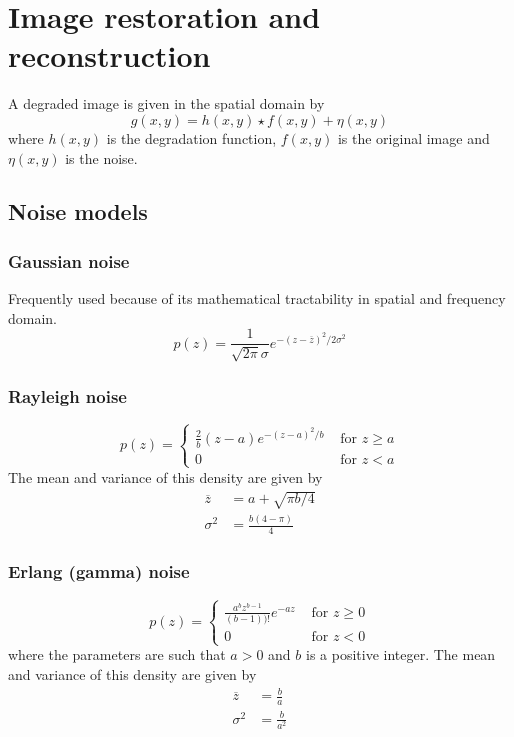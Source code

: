 \section{Image restoration and reconstruction }
A degraded image is given in the spatial domain by
\begin{equation}
	g(x,y) = h(x,y) \star f(x,y) + \eta(x,y)
\end{equation}
where $h(x,y)$ is the degradation function, $f(x,y)$ is the original image and $\eta(x,y)$ is the noise.

\subsection{Noise models  }
	\subsubsection{Gaussian noise}
		Frequently used because of its mathematical tractability in spatial and frequency domain.
		\begin{equation}
			p(z) = \frac{1}{\sqrt{2\pi} \sigma} e^{-\left(z-\overline{z}\right)^2 / 2\sigma^2}
		\end{equation}
		
	\subsubsection{Rayleigh noise}
		\begin{equation}
			p(z) = 
				\begin{cases}
					\frac{2}{b} \left(z-a\right) e^{-\left(z-a\right)^2/b} & \text{ for } z\geq a \\
					0 & \text{ for } z < a
				\end{cases}
		\end{equation}
		The mean and variance of this density are given by
		\begin{align}
			\overline{z} &= a + \sqrt{\pi b / 4} \\
			\sigma^2 &= \frac{b\left(4-\pi\right)}{4}
		\end{align}
		
	\subsubsection{Erlang (gamma) noise}
		\begin{equation}
			p(z) = 
				\begin{cases}
					\frac{a^bz^{b-1}}{\left(b-1\right))!} e^{-az} & \text{ for } z \geq 0 \\
					0 & \text{ for } z < 0
				\end{cases}
		\end{equation}	
		where the parameters are such that $a>0$ and $b$ is a positive integer. The mean and variance of this density are given by
		\begin{align}
			\overline{z} &= \frac{b}{a} \\
			\sigma^2 &= \frac{b}{a^2}
		\end{align}
		
